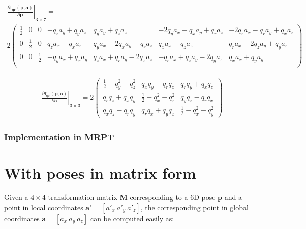 \documentclass[a4paper,10pt]{report}
\begin{document}
\small{
\begin{equation}
 \begin{array}{l}
\left. 
\frac{\partial \mathbf{f_{qr}} (\mathbf{p},\mathbf{a})}{\partial \mathbf{p}} 
\right|_{3 \times 7} = \\
  2 
  \left(
  \begin{array}{ccccccc}
    \frac{1}{2}  & 0 & 0 & -q_z a_y +q_y a_z   & q_y a_y + q_z a_z   &   -2q_y a_x + q_x a_y +q_r a_z & -2q_z a_x - q_r a_y +q_x a_z \\ 
    0  & \frac{1}{2} & 0 & q_z a_x - q_x a_z   & q_y a_x - 2q_x a_y -q_r a_z  & q_x a_x +q_z a_z   & q_r a_x - 2 q_z a_y +q_y a_z \\
    0  & 0 & \frac{1}{2} & -q_y a_x + q_x a_y  & q_z a_x + q_r a_y - 2q_x a_z  & -q_r a_x + q_z a_y - 2 q_y a_z  & q_x a_x + q_y a_y \\    
  \end{array}
  \right)
 \end{array}
\label{eq:quat_rot_point_func_jacob1}
\end{equation}

\begin{equation}
 \begin{array}{l}
\left. 
\frac{\partial \mathbf{f_{qr}} (\mathbf{p},\mathbf{a})}{\partial \mathbf{a}}
\right|_{3 \times 3} = 
  2
  \left(
  \begin{array}{ccc}
    \frac{1}{2}-q_y^2-q_z^2   & q_x q_y - q_r q_z   & q_r q_y + q_x q_z \\
    q_r q_z + q_x q_y  & \frac{1}{2} - q_x^2-q_z^2  & q_y q_z - q_r q_x \\
    q_x q_z - q_r q_y  & q_r q_x + q_y q_z & \frac{1}{2} - q_x^2-q_y^2
  \end{array}
  \right) 
\label{eq:quat_rot_point_func_jacob2}
 \end{array}
\end{equation}
}


\subsubsection{Implementation in MRPT}



\section{With poses in matrix form}
\label{sect:comp_point:mat}

Given a $4\times 4$ transformation matrix $\mathbf{M}$ corresponding to a 6D pose 
$\mathbf{p}$ and a point in local coordinates 
$\mathbf{a'} = [a'_x ~ a'_y ~ a'_z]$, the corresponding point in global coordinates
$\mathbf{a} = [a_x ~ a_y ~ a_z]$ can be computed easily as:
\end{document}
